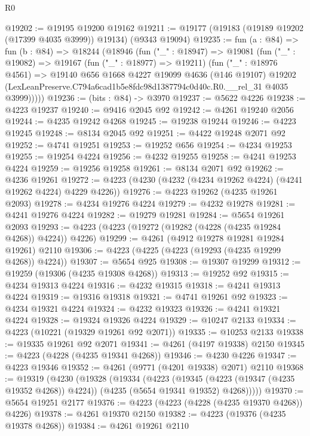 \begin{lexlean}{R0}
\begin{coremodule}
@19202 := @19195 @19200 @19162
@19211 := @19177 (@19183 (@19189 @19202 (@17399 @4035 @3999)) @19134) (@9343 @19094)
@19235 := fun (a : @84) =>
  fun (b : @84) =>
  @18244
    (@18946
      (fun ("_" : @18947) =>
      @19081
        (fun ("_" : @19082) =>
        @19167
          (fun ("_" : @18977) => @19211)
          (fun ("_" : @18976 @4561) =>
          @19140
            @656
            @1668
            @4227
            @19099
            @4636
            (@146 @19107)
            @19202
            (LexLeanPreserve.C794a6cad1b5e8fdc98d1387794c0d40c.R0.__rel_31 @4035 @3999)))))
@19236 := (bits : @84) -> @3970
@19237 := @5622 @4226
@19238 := @4223 @19237
@19240 := @9416 @2045 @92
@19242 := @4261 @19240 @2056
@19244 := @4235 @19242 @4268
@19245 := @19238 @19244
@19246 := @4223 @19245
@19248 := @8134 @2045 @92
@19251 := @4422 @19248 @2071 @92
@19252 := @4741 @19251
@19253 := @19252 @656
@19254 := @4234 @19253
@19255 := @19254 @4224
@19256 := @4232 @19255
@19258 := @4241 @19253 @4224
@19259 := @19256 @19258
@19261 := @8134 @2071 @92
@19262 := @4236 @19261
@19272 := @4223 (@4230 (@4232 (@4234 @19262 @4224) (@4241 @19262 @4224) @4229 @4226))
@19276 := @4223 @19262 (@4235 @19261 @2093)
@19278 := @4234 @19276 @4224
@19279 := @4232 @19278
@19281 := @4241 @19276 @4224
@19282 := @19279 @19281
@19284 := @5654 @19261 @2093
@19293 := @4223 (@4223 (@19272 (@19282 (@4228 (@4235 @19284 @4268)) @4224)) @4226)
@19299 := @4261 (@4912 @19278 @19281 @19284 @19261) @2110
@19306 := @4223 (@4225 (@4223 (@19293 (@4235 @19299 @4268)) @4224))
@19307 := @5654 @925
@19308 := @19307 @19299
@19312 := @19259 (@19306 (@4235 @19308 @4268))
@19313 := @19252 @92
@19315 := @4234 @19313 @4224
@19316 := @4232 @19315
@19318 := @4241 @19313 @4224
@19319 := @19316 @19318
@19321 := @4741 @19261 @92
@19323 := @4234 @19321 @4224
@19324 := @4232 @19323
@19326 := @4241 @19321 @4224
@19328 := @19324 @19326 @4224
@19329 := @10247 @2133
@19334 := @4223 (@10221 (@19329 @19261 @92 @2071))
@19335 := @10253 @2133
@19338 := @19335 @19261 @92 @2071
@19341 := @4261 (@4197 @19338) @2150
@19345 := @4223 (@4228 (@4235 @19341 @4268))
@19346 := @4230 @4226
@19347 := @4223 @19346
@19352 := @4261 (@9771 (@4201 @19338) @2071) @2110
@19368 := @19319
    (@4230
      (@19328
        (@19334
          (@4223
            (@19345 (@4223 (@19347 (@4235 @19352 @4268)) @4224))
            (@4235 (@5654 @19341 @19352) @4268)))))
@19370 := @5654 @19251 @2177
@19376 := @4223 (@4223 (@4228 (@4235 @19370 @4268)) @4226)
@19378 := @4261 @19370 @2150
@19382 := @4223 (@19376 (@4235 @19378 @4268))
@19384 := @4261 @19261 @2110

\end{coremodule}
\end{lexlean}
